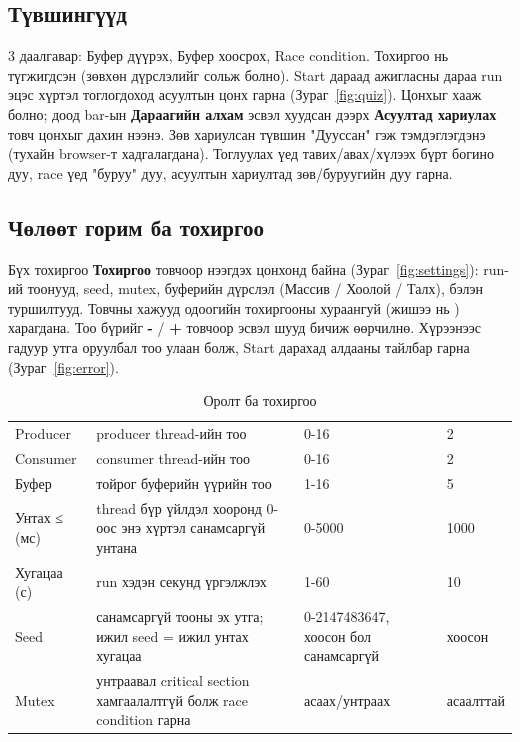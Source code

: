 \documentclass[12pt,a4paper]{article}
\begin{document}

\subsection{Түвшингүүд}\label{sec:levels}
3 даалгавар: Буфер дүүрэх, Буфер хоосрох, Race condition. Тохиргоо нь түгжигдсэн (зөвхөн дүрслэлийг сольж болно). Start дараад ажигласны дараа run эцэс хүртэл тоглогдоход асуултын цонх гарна (Зураг~\ref{fig:quiz}). Цонхыг хааж болно; доод bar-ын \textbf{Дараагийн алхам} эсвэл хуудсан дээрх \textbf{Асуултад хариулах} товч цонхыг дахин нээнэ. Зөв хариулсан түвшин "Дууссан" гэж тэмдэглэгдэнэ (тухайн browser-т хадгалагдана). Тоглуулах үед тавих/авах/хүлээх бүрт богино дуу, race үед "буруу" дуу, асуултын хариултад зөв/буруугийн дуу гарна.


\subsection{Чөлөөт горим ба тохиргоо}\label{sec:play}
Бүх тохиргоо \textbf{Тохиргоо} товчоор нээгдэх цонхонд байна (Зураг~\ref{fig:settings}): run-ий тоонууд, seed, mutex, буферийн дүрслэл (Массив / Хоолой / Талх), бэлэн туршилтууд. Товчны хажууд одоогийн тохиргооны хураангуй (жишээ нь ) харагдана. Тоо бүрийг \textbf{-} / \textbf{+} товчоор эсвэл шууд бичиж өөрчилнө. Хүрээнээс гадуур утга оруулбал тоо улаан болж, Start дарахад алдааны тайлбар гарна (Зураг~\ref{fig:error}).

\begin{table}[H]\centering\small
\caption{Оролт ба тохиргоо}\label{tab:input}
\begin{tabular}{|L{0.17\textwidth}|L{0.43\textwidth}|L{0.24\textwidth}|L{0.16\textwidth}|}\hline
{} &  &  &  \\\hline
Producer & producer thread-ийн тоо & 0-16 & 2 \\\hline
Consumer & consumer thread-ийн тоо & 0-16 & 2 \\\hline
Буфер & тойрог буферийн үүрийн тоо & 1-16 & 5 \\\hline
Унтах ≤ (мс) & thread бүр үйлдэл хооронд 0-оос энэ хүртэл санамсаргүй унтана & 0-5000 & 1000 \\\hline
Хугацаа (с) & run хэдэн секунд үргэлжлэх & 1-60 & 10 \\\hline
Seed & санамсаргүй тооны эх утга; ижил seed = ижил унтах хугацаа & 0-2147483647, хоосон бол санамсаргүй & хоосон \\\hline
Mutex & унтраавал critical section хамгаалалтгүй болж race condition гарна & асаах/унтраах & асаалттай \\\hline
\end{tabular}
\end{table}
\end{document}
